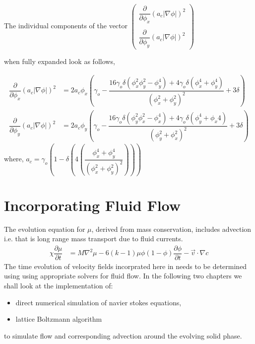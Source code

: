 \documentclass[12pt,a4paper]{report}
\begin{document}
\begin{mdframed}[style=MyFrame]
The individual components of the vector 
$\begin{pmatrix}
	\dfrac{\partial}{\partial \phi_x}\left(a_c|\nabla\phi|\right)^2\\
	\\
	\dfrac{\partial}{\partial \phi_y}\left(a_c|\nabla\phi|\right)^2
\end{pmatrix}$

when fully expanded look as follows,

\begin{align}
 \dfrac{\partial}{\partial \phi_x}\left(a_c|\nabla\phi|\right)^2 &= 2a_c\phi_x\left(\gamma_o - \dfrac{16\gamma_o\delta\left(\phi_x^2\phi_y^2 - \phi_y^4\right)+4\gamma_o\delta\left(\phi_x^4+\phi_y^4\right)}
 {\left(\phi_x^2+\phi_y^2\right)^2} + 3\delta\right)\\ 
 \dfrac{\partial}{\partial \phi_y}\left(a_c|\nabla\phi|\right)^2 &= 2a_c\phi_y\left(\gamma_o - \dfrac{16\gamma_o\delta\left(\phi_y^2\phi_x^2 - \phi_x^4\right)+4\gamma_o\delta\left(\phi_y^4+\phi_x4\right)}
 {\left(\phi_y^2+\phi_x^2\right)^2} + 3\delta\right)
\end{align}
where, $ a_c = \gamma_o\left(1 - \delta\left(4\left(\dfrac{\phi_x^4+\phi_y^4}{\left(\phi_x^2+\phi_y^2\right)^2}\right)\right)\right)$
\end{mdframed}

\section{Incorporating Fluid Flow}
The evolution equation for $\mu$, derived from mass conservation, includes advection i.e. that is long range 
mass transport due to fluid currents.
\begin{align}
\chi \dfrac{\partial \mu}{\partial t} &=  M\nabla^2\mu 
	- 6\left(k-1\right)\mu\phi\left(1-\phi\right)\dfrac{\partial\phi}{\partial t}- \vec{v}\cdot\nabla c
\label{mu_evolution}
\end{align}
The time evolution of velocity fields incorprated here in needs to be determined using using appropriate solvers for fluid flow. In the following two chapters we shall look at the implementation of: 
\begin{itemize}
	\item direct numerical simulation of navier stokes equations,
	\item lattice Boltzmann algorithm
\end{itemize}
to simulate flow and corresponding advection around the evolving solid phase.
\end{document}
